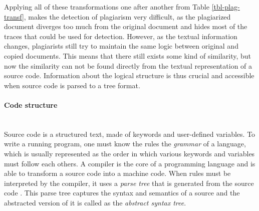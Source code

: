 \begin{table}[ht]
\centering
\caption{Transformation levels.}
\label{tbl-plag-transf}
\end{table}

\noindent
Applying all of these transformations one after another from Table \ref{tbl-plag-transf}, makes the detection of plagiarism very difficult, as the plagiarized document diverges too much from the original document and hides most of the traces that could be used for detection. However, as the textual information changes, plagiarists still try to maintain the same logic between original and copied documents. This means that there still exists some kind of similarity, but now the similarity can not be found directly from the textual representation of a source code. Information about the logical structure is thus crucial and accessible when source code is parsed to a tree format.

\paragraph{Code structure}\mbox{}\\
Source code is a structured text, made of keywords and user-defined variables. To write a running program, one must know the rules \ie the \emph{grammar} of a language, which is usually represented as the order in which various keywords and variables must follow each others. A compiler is the core of a programming language and is able to transform a source code into a machine code. When rules must be interpreted by the compiler, it uses a \emph{parse tree} that is generated from the source code \cite{johnson1975yacc}. This parse tree captures the syntax and semantics of a source and the abstracted version of it is called as the \emph{abstract syntax tree}. 

